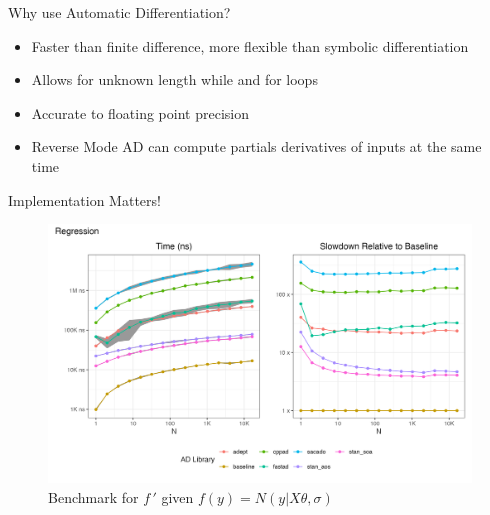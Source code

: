 \documentclass[dvipsnames]{beamer}
\begin{document}
\begin{frame}{Why use Automatic Differentiation?}
\begin{itemize}
\item Faster than finite difference, more flexible than symbolic differentiation
\item Allows for unknown length while and for loops
\item Accurate to floating point precision
\item Reverse Mode AD can compute partials derivatives of inputs at the same time
\end{itemize}
\end{frame}

\begin{frame}{Implementation Matters!}
\begin{figure}
\centerline{\includegraphics[scale=.5]{img/mac_regression_plot.png}}
\caption{Benchmark for $f\,'$ given $f(y) = N(y | X\theta,\sigma)$}
\label{fig-mac-red-bench}
\end{figure}
\end{frame}
\end{document}
